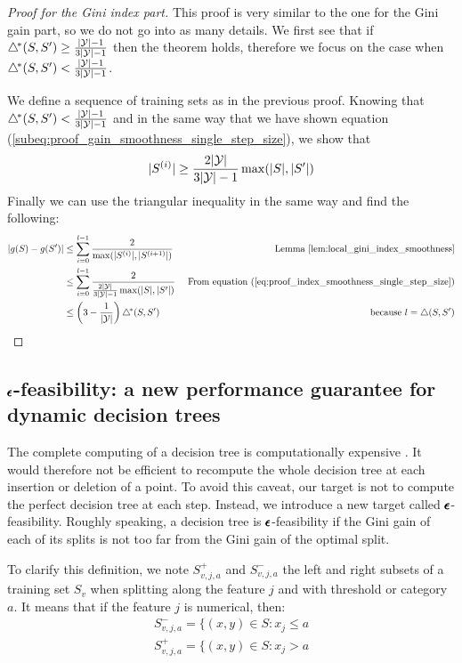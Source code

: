 \begin{proof}[Proof for the Gini index part]
    This proof is very similar to the one for the Gini gain part, so we do not go into as many details. We first see that if $\triangle^{\!*}(S, S') \geq \frac{|\mathcal{Y}|-1}{3|\mathcal{Y}| - 1}$ then the theorem holds, therefore we focus on the case when $\triangle^{\!*}(S, S') < \frac{|\mathcal{Y}|-1}{3|\mathcal{Y}| - 1}$.

    We define a sequence of training sets as in the previous proof. Knowing that $\triangle^{\!*}(S, S') < \frac{|\mathcal{Y}|-1}{3|\mathcal{Y}| - 1}$ and in the same way that we have shown equation (\ref{subeq:proof_gain_smoothness_single_step_size}), we show that 
    \begin{equation}\label{eq:proof_index_smoothness_single_step_size}
        |S^{(i)}| \geq \frac{2|\mathcal{Y}|}{3|\mathcal{Y}| - 1}\max(|S|, |S'|)
    \end{equation}
    Finally we can use the triangular inequality in the same way and find the following:
    \begin{align*}
        |g(S) - g(S')| &\leq \sum_{i=0}^{l-1} \frac{2}{\max(|S^{(i)}|, |S^{(i+1)}|)} & \text{ Lemma \ref{lem:local_gini_index_smoothness}}\\
        &\leq \sum_{i=0}^{l-1} \frac{2}{\frac{2|\mathcal{Y}|}{3|\mathcal{Y}| - 1}\max(|S|, |S'|)} & \text{ From equation (\ref{eq:proof_index_smoothness_single_step_size})}\\
        &\leq \left(3-\frac{1}{|\mathcal{Y}|}\right) \triangle^{\!*}(S,S')& \text{ because $l = \triangle(S, S')$}
    \end{align*}
\end{proof}

\subsection{$\pmb{\epsilon}$-feasibility: a new performance guarantee for dynamic decision trees}

The complete computing of a decision tree is computationally expensive . It would therefore not be efficient to recompute the whole decision tree at each insertion or deletion of a point. To avoid this caveat, our target is not to compute the perfect decision tree at each step. Instead, we introduce a new target called $\pmb{\epsilon}$-feasibility. Roughly speaking, a decision tree is $\pmb{\epsilon}$-feasibility if the Gini gain of each of its splits is not too far from the Gini gain of the optimal split.

To clarify this definition, we note $S^+_{v, j, a}$ and $S^-_{v, j, a}$ the left and right subsets of a training set $S_v$ when splitting along the feature $j$ and with threshold or category $a$. It means that if the feature $j$ is numerical, then:
\begin{equation}
    \begin{split}
        S^-_{v, j, a} = \{(x, y) \in S : x_j \leq a\\
        S^+_{v, j, a} = \{(x, y) \in S : x_j > a\\
    \end{split}
\end{equation}

